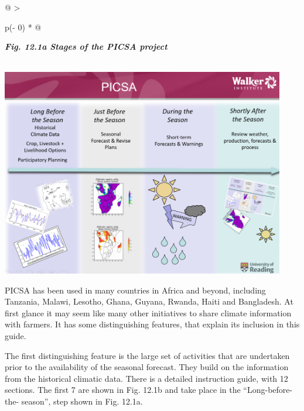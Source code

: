 \documentclass[
  letterpaper,
  DIV=11,
  numbers=noendperiod]{scrreprt}
\begin{document}
\begin{longtable}[]{@{}
  >{\raggedright\arraybackslash}p{(\columnwidth - 0\tabcolsep) * }@{}}
\toprule\noalign{}
\begin{minipage}[b]{\linewidth}\raggedright
\textbf{\emph{Fig. 12.1a Stages of the PICSA project}}
\end{minipage} \\
\midrule\noalign{}
\endhead
\bottomrule\noalign{}
\endlastfoot
\includegraphics[width=4.88043in,height=3.58922in]{figures/Fig12.1a.png} \\
\end{longtable}

PICSA has been used in many countries in Africa and beyond, including
Tanzania, Malawi, Lesotho, Ghana, Guyana, Rwanda, Haiti and Bangladesh.
At first glance it may seem like many other initiatives to share climate
information with farmers. It has some distinguishing features, that
explain its inclusion in this guide.

The first distinguishing feature is the large set of activities that are
undertaken prior to the availability of the seasonal forecast. They
build on the information from the historical climatic data. There is a
detailed instruction guide, with 12 sections. The first 7 are shown in
Fig. 12.1b and take place in the ``Long-before-the- season'', step shown
in Fig. 12.1a.
\end{document}
